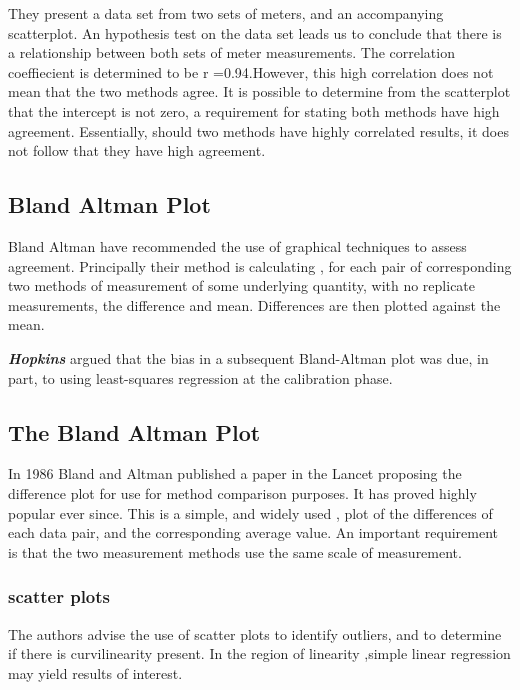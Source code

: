 \documentclass[12pt, a4paper]{report}
\begin{document}
	They present a data set from two sets of meters, and an
	accompanying scatterplot. An hypothesis test on the data set leads
	us to conclude that there is a relationship between both sets of
	meter measurements. The correlation coeffiecient is determined to
	be r =0.94.However, this high correlation does not mean that the
	two methods agree. It is possible to determine from the
	scatterplot that the intercept is not zero, a requirement for
	stating both methods have high agreement. Essentially, should two
	methods have highly correlated results, it does not follow that
	they have high agreement.
	
	\subsection{Bland Altman Plot}
	Bland Altman have recommended the use of graphical techniques to
	assess agreement. Principally their method is calculating , for
	each pair of corresponding two methods of measurement of some
	underlying quantity, with no replicate measurements, the
	difference and mean. Differences are then plotted against the
	mean.
	
	\textbf{\textit{Hopkins}} argued that the bias in a subsequent Bland-Altman plot was
	due, in part, to using least-squares regression at the calibration
	phase.
	
	
	\subsection{The Bland Altman Plot}
	In 1986 Bland and Altman published a paper in the Lancet proposing
	the difference plot for use for method comparison purposes. It has
	proved highly popular ever since. This is a simple, and widely
	used , plot of the differences of each data pair, and the
	corresponding average value. An important requirement is that the
	two measurement methods use the same scale of measurement.
	
	\subsubsection{scatter plots} The authors advise the
	use of scatter plots to identify outliers, and to determine if
	there is curvilinearity present. In the region of linearity
	,simple linear regression may yield results of interest.
	
\end{document}
